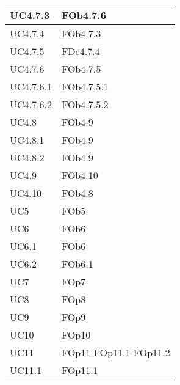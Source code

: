 \begin{longtable}{|l|p{4cm}|}
\hline
		UC4.7.3 & FOb4.7.6 \linebreak   \\
\hline
		UC4.7.4 & FOb4.7.3 \linebreak   \\
\hline
		UC4.7.5 & FDe4.7.4 \linebreak   \\
\hline
		UC4.7.6 & FOb4.7.5 \linebreak   \\
\hline
		UC4.7.6.1 & FOb4.7.5.1 \linebreak   \\
\hline
		UC4.7.6.2 & FOb4.7.5.2 \linebreak   \\
\hline
		UC4.8 & FOb4.9 \linebreak   \\
\hline
		UC4.8.1 & FOb4.9 \linebreak   \\
\hline
		UC4.8.2 & FOb4.9 \linebreak   \\
\hline
		UC4.9 & FOb4.10 \linebreak   \\
\hline
		UC4.10 & FOb4.8 \linebreak   \\
\hline
		UC5 & FOb5 \linebreak   \\
\hline
		UC6 & FOb6 \linebreak   \\
\hline
		UC6.1 & FOb6 \linebreak   \\
\hline
		UC6.2 & FOb6.1 \linebreak   \\
\hline
		UC7 & FOp7 \linebreak   \\
\hline
		UC8 & FOp8 \linebreak   \\
\hline
		UC9 & FOp9 \linebreak   \\
\hline
		UC10 & FOp10 \linebreak   \\
\hline
		UC11 & FOp11 \linebreak  FOp11.1 \linebreak  FOp11.2 \linebreak   \\
\hline
		UC11.1 & FOp11.1 \linebreak   \\

\end{longtable}
